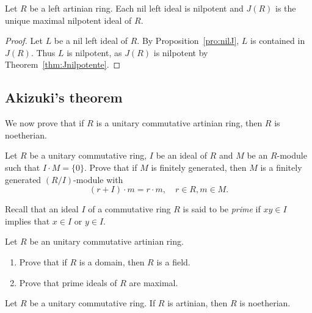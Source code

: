 \begin{corollary}
	Let $R$ be a left artinian ring. Each nil left ideal is nilpotent and 
	$J(R)$ is the unique maximal nilpotent ideal of $R$. 
\end{corollary}

\begin{proof}
	Let $L$ be a nil left ideal of $R$. By Proposition~\ref{pro:nilJ}, $L$
	is contained in $J(R)$. Thus $L$ is nilpotent, as $J(R)$ 
	is nilpotent by Theorem~\ref{thm:Jnilpotente}. 
\end{proof}

\subsection{Akizuki's theorem}

We now prove that 
if $R$ is a unitary commutative artinian ring, 
then $R$ is noetherian. 

\begin{exercise}
\label{xca:I_fg}
    Let $R$ be a unitary commutative ring, $I$ be an ideal of $R$
    and $M$ be an $R$-module such that $I\cdot M=\{0\}$. Prove that
    if $M$ is finitely generated, then $M$ is a finitely generated
    $(R/I)$-module with
    \[
    (r+I)\cdot m=r\cdot m,\quad r\in R,m\in M.
    \]
\end{exercise}

Recall that an ideal $I$  
of a commutative ring 
$R$ is said to be \emph{prime} if 
$xy\in I$ implies that $x\in I$ or $y\in I$. 

\begin{exercise}
    Let $R$ be an unitary commutative artinian ring. 
    \begin{enumerate}
        \item Prove that if $R$ is a domain, then $R$ is a field. 
        \item Prove that prime ideals of $R$ are maximal. 
    \end{enumerate}
\end{exercise}


\begin{theorem}[Akizuki]
    Let $R$ be a unitary commutative ring. If $R$ is artinian, 
    then $R$ is noetherian.
\end{theorem}

